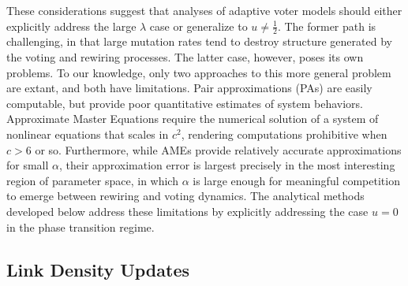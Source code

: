 \documentclass[english]{scrartcl}
\begin{document}
		These considerations suggest that analyses of adaptive voter models should either explicitly address the large $\lambda$ case or generalize to $u \neq \frac{1}{2}$. 
		The former path is challenging, in that large mutation rates tend to destroy structure generated by the voting and rewiring processes. 
		The latter case, however, poses its own problems. 
		To our knowledge, only two approaches to this more general problem are extant, and both have limitations. 
		Pair approximations (PAs) are easily computable, but provide poor quantitative estimates of system behaviors. 
		Approximate Master Equations \cite{Durrett2012,Gleeson2013} require the numerical solution of a system of nonlinear equations that scales in $c^2$, rendering computations prohibitive when $c > 6$ or so. 
		Furthermore, while AMEs provide relatively accurate approximations for small $\alpha$, their approximation error is largest precisely in the most interesting region of parameter space, in which $\alpha$ is large enough for meaningful competition to emerge between rewiring and voting dynamics. 
		The analytical methods developed below address these limitations by explicitly addressing the case $u = 0$ in the phase transition regime. 



	\subsection{Link Density Updates}
\end{document}

